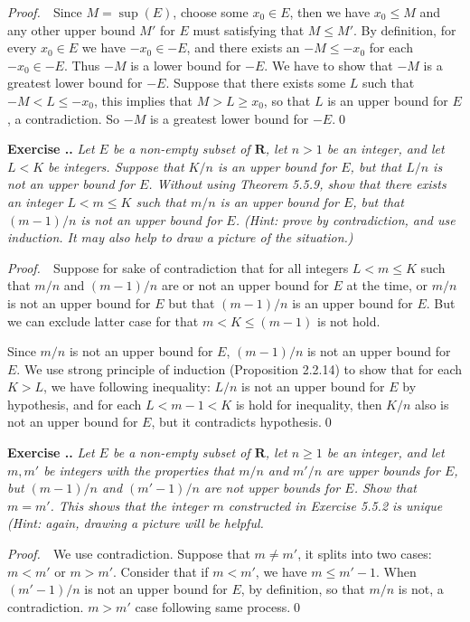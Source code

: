 \documentclass{book}
\newcommand{\pff}{\vspace{.25em}\noindent\emph{Proof.}~~}
\newcounter{Exercise}[section]
\renewcommand{\theExercise}{\thesection.\arabic{Exercise}.}
\newcommand{\new}{\vspace{1.5em}\noindent\textbf{{Exercise \stepcounter{Exercise}\textbf{\theExercise}}} }
\begin{document}
\pff Since $M=\sup(E)$, choose some $x_0\in E$, then we have $x_0\leq M$ and any other upper bound $M'$ for $E$ must satisfying that $M\leq M'$. By definition, for every $x_0\in E$ we have $-x_0\in-E$, and there exists an $-M\leq-x_0$ for each $-x_0\in -E$. Thus $-M$ is a lower bound for $-E$. We have to show that $-M$ is a greatest lower bound for $-E$. Suppose that there exists some $L$ such that $-M<L\leq-x_0$, this implies that $M>L\geq x_0$, so that $L$ is an upper bound for $E$, a contradiction. So $-M$ is a greatest lower bound for $-E$.\qed

\new\emph{Let $E$ be a non-empty subset of $\mathbf{R}$, let $n>1$ be an integer, and let $L<K$ be integers. Suppose that $K/n$ is an upper bound for $E$, but that $L/n$ is not an upper bound for $E$. Without using Theorem 5.5.9, show that there exists an integer $L<m\leq K$ such that $m/n$ is an upper bound for $E$, but that $(m-1)/n$ is not an upper bound for $E$. (Hint: prove by contradiction, and use induction. It may also help to draw a picture of the situation.)}

\pff Suppose for sake of contradiction that for all integers $L<m\leq K$ such that $m/n$ and $(m-1)/n$ are or not an upper bound for $E$ at the time, or $m/n$ is not an upper bound for $E$ but that $(m-1)/n$ is an upper bound for $E$. But we can exclude latter case for that $m<K\leq (m-1)$ is not hold.

Since $m/n$ is not an upper bound for $E$, $(m-1)/n$ is not an upper bound for $E$. We use strong principle of induction (Proposition 2.2.14) to show that for each $K>L$, we have following inequality: $L/n$ is not an upper bound for $E$ by hypothesis, and for each $L<m-1< K$ is hold for inequality, then $K/n$ also is not an upper bound for $E$, but it contradicts hypothesis.\qed

\new\emph{Let $E$ be a non-empty subset of $\mathbf{R}$, let $n\geq 1$ be an integer, and let $m,m'$ be integers with the properties that $m/n$ and $m'/n$ are upper bounds for $E$, but $(m-1)/n$ and $(m'-1)/n$ are not upper bounds for $E$. Show that $m=m'$. This shows that the integer $m$ constructed in Exercise 5.5.2 is unique (Hint: again, drawing a picture will be helpful.}

\pff We use contradiction. Suppose that $m\neq m'$, it splits into two cases: $m<m'$ or $m>m'$. Consider that if $m<m'$, we have $m\leq m'-1$. When $(m'-1)/n$ is not an upper bound for $E$, by definition, so that $m/n$ is not, a contradiction. $m>m'$ case following same process.\qed
\end{document}

